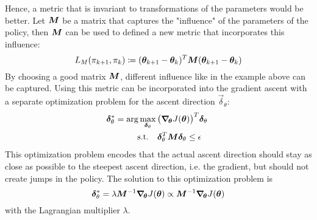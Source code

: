 			Hence, a metric that is invariant to transformations of the parameters would be better. Let \(\bm{M}\) be a matrix that captures the "influence" of the parameters of the policy, then \(\bm{M}\) can be used to defined a new metric that incorporates this influence:
			\begin{equation*}
				L_M(\pi_{k + 1}, \pi_k) \coloneqq (\bm{\theta}_{k + 1} - \bm{\theta}_k)^T \bm{M} (\bm{\theta}_{k + 1} - \bm{\theta}_k)
			\end{equation*}
			By choosing a good matrix \(\bm{M}\), different influence like in the example above can be captured. Using this metric can be incorporated into the gradient ascent with a separate optimization problem for the ascent direction \( \vec{\delta}_\theta \):
			\begin{equation}
				\begin{aligned}
					\bm{\delta}_\theta^\ast = \arg\max_{\bm{\delta}_\theta} \,& \big( \grad_{\!\bm{\theta}} J(\bm{\theta}) \big)^T \bm{\delta}_\theta \\
					\mathrm{s.t.} \quad&
						\begin{aligned}[t]
							\bm{\delta}_\theta^T \bm{M} \bm{\delta}_\theta & \leq \epsilon
						\end{aligned}
				\end{aligned}  \label{eq:policyGradientAscentOpt}
			\end{equation}
			This optimization problem encodes that the actual ascent direction should stay as close as possible to the steepest ascent direction, i.e. the gradient, but should not create jumps in the policy. The solution to this optimization problem is
			\begin{equation*}
				\bm{\delta}_\theta^\ast = \lambda \bm{M}^{-1} \grad_{\!\bm{\theta}} J(\bm{\theta}) \propto \bm{M}^{-1} \grad_{\!\bm{\theta}} J(\bm{\theta})
			\end{equation*}
			with the Lagrangian multiplier \(\lambda\).

